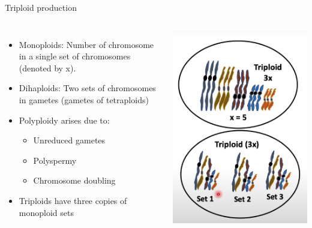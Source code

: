 \documentclass[
  ignorenonframetext,
  aspectratio=169]{beamer}
\providecommand{\tightlist}{%
  \setlength{\itemsep}{0pt}\setlength{\parskip}{0pt}}
\newcommand{\bcolumns}{\begin{columns}[T, onlytextwidth]}
\newcommand{\ecolumns}{\end{columns}}
\begin{document}
\begin{frame}{Triploid production}
\bcolumns
{}

\begin{itemize}
\tightlist
\item
  Monoploids: Number of chromosome in a single set of chromosomes
  (denoted by x).
\item
  Dihaploids: Two sets of chromosomes in gametes (gametes of
  tetraploids)
\item
  Polyploidy arises due to:

  \begin{itemize}
  \tightlist
  \item
    Unreduced gametes
  \item
    Polyspermy
  \item
    Chromosome doubling
  \end{itemize}
\item
  Triploids have three copies of monoploid sets
\end{itemize}


\begin{center}\includegraphics[width=0.58\linewidth]{../images/triploidy} \end{center}

\ecolumns
\end{frame}

\hypertarget{section-3}{%
\subsection{}\label{section-3}}
\end{document}
